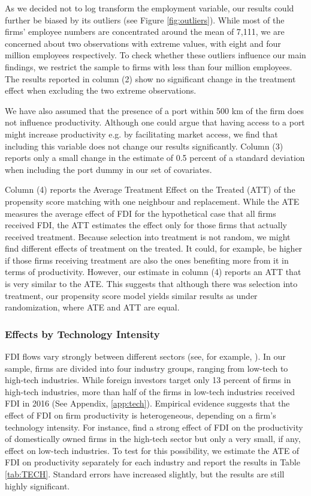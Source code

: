 \documentclass[a4paper,11pt]{scrartcl}
\begin{document}
As we decided not to log transform the employment variable, our results could further be biased by its outliers (see Figure \ref{fig:outliers}). While most of the firms' employee numbers are concentrated around the mean of 7,111, we are concerned about two observations with extreme values, with eight and four million employees respectively. To check whether these outliers influence our main findings, we restrict the sample to firms with less than four million employees. The results reported in column (2) show no significant change in the treatment effect when excluding the two extreme observations. 

We have also assumed that the presence of a port within 500 km of the firm does not influence productivity. Although one could argue that having access to a port might increase productivity e.g. by facilitating market access, we find that including this variable does not change our results significantly.  Column (3) reports only a small change in the estimate of 0.5 percent of a standard deviation when including the port dummy in our set of covariates. 

Column (4) reports the Average Treatment Effect on the Treated (ATT) of the propensity score matching with one neighbour and replacement. While the ATE measures the average effect of FDI for the hypothetical case that all firms received FDI, the ATT estimates the effect only for those firms that actually received treatment. Because selection into treatment is not random, we might find different effects of treatment on the treated. 
It could, for example, be higher if those firms receiving treatment are also the ones benefiting more from it in terms of productivity. 
However, our estimate in column (4) reports an ATT that is very similar to the ATE. This suggests that although there was selection into treatment, our propensity score model yields similar results as under randomization, where ATE and ATT are equal.

\subsubsection*{Effects by Technology Intensity}

FDI flows vary strongly between different sectors (see, for example, \citet{Smarzynska2004, Keller2009, Haskel2007}). In our sample, firms are divided into four industry groups, ranging from low-tech to high-tech industries. While foreign investors target only 13 percent of firms in high-tech industries, more than half of the firms in low-tech industries received FDI in 2016 (See Appendix, \ref{app:tech}). Empirical evidence suggests that the effect of FDI on firm productivity is heterogeneous, depending on a firm's technology intensity.
For instance, \citet{Keller2009} find a strong effect of FDI on the productivity of domestically owned firms in the high-tech sector but only a very small, if any, effect on low-tech industries. 
To test for this possibility, we estimate the ATE of FDI on productivity separately for each industry and report the results in Table \ref{tab:TECH}. Standard errors have increased slightly, but the results are still highly significant. 
\end{document}
